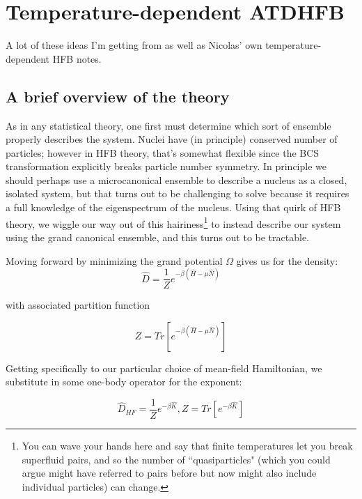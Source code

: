 \chapter{Temperature-dependent ATDHFB}

A lot of these ideas I'm getting from \cite{Schunck2015} as well as Nicolas' own temperature-dependent HFB notes.

\section{A brief overview of the theory}

As in any statistical theory, one first must determine which sort of ensemble properly describes the system. Nuclei have (in principle) conserved number of particles; however in HFB theory, that's somewhat flexible since the BCS transformation explicitly breaks particle number symmetry. In principle we should perhaps use a microcanonical ensemble to describe a nucleus as a closed, isolated system, but that turns out to be challenging to solve because it requires a full knowledge of the eigenspectrum of the nucleus. Using that quirk of HFB theory, we wiggle our way out of this hairiness\footnote{You can wave your hands here and say that finite temperatures let you break superfluid pairs, and so the number of ``quasiparticles" (which you could argue might have referred to pairs before but now might also include individual particles) can change.} to instead describe our system using the grand canonical ensemble, and this turns out to be tractable.

Moving forward by minimizing the grand potential $\Omega$ gives us for the density:
\begin{equation*}
\hat{D} = \frac{1}{Z}e^{-\beta\left(\hat{H}-\mu\hat{N}\right)}
\end{equation*}

\noindent with associated partition function

\begin{equation*}
Z = Tr\left[e^{-\beta\left(\hat{H}-\mu\hat{N}\right)}\right]
\end{equation*}

Getting specifically to our particular choice of mean-field Hamiltonian, we substitute in some one-body operator for the exponent:

\begin{equation*}
\hat{D}_{HF} = \frac{1}{Z}e^{-\beta\hat{K}}, Z = Tr\left[e^{-\beta\hat{K}}\right]
\end{equation*}

